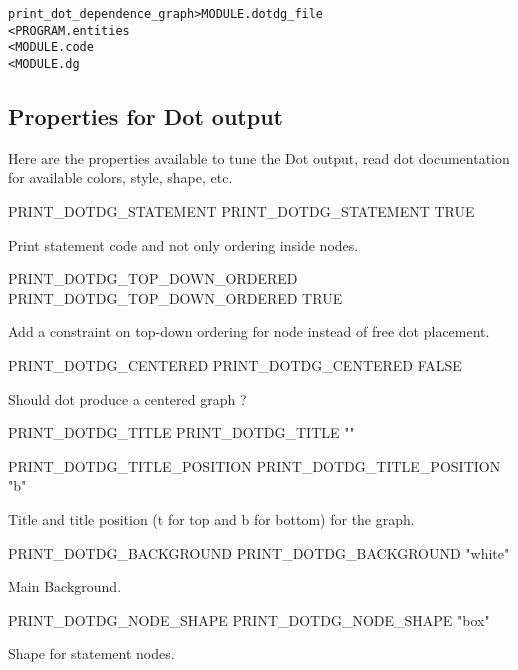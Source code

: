 \documentclass[a4paper]{report}
\newenvironment{PipsMake}{\begin{alltt}}{\end{alltt}}
\begin{document}
\begin{PipsMake}
print_dot_dependence_graph          > MODULE.dotdg_file
        < PROGRAM.entities
        < MODULE.code
        < MODULE.dg
\end{PipsMake}

\subsection{Properties for Dot output}

Here are the properties available to tune the Dot output, read dot
documentation for available colors, style, shape, etc.

\begin{PipsProp}{PRINT_DOTDG_STATEMENT}
PRINT_DOTDG_STATEMENT TRUE
\end{PipsProp}

Print statement code and not only ordering inside nodes.

\begin{PipsProp}{PRINT_DOTDG_TOP_DOWN_ORDERED}
  PRINT_DOTDG_TOP_DOWN_ORDERED TRUE
\end{PipsProp}

Add a constraint on top-down ordering for node instead of free dot placement.

\begin{PipsProp}{PRINT_DOTDG_CENTERED}
PRINT_DOTDG_CENTERED FALSE
\end{PipsProp}

Should dot produce a centered graph ?

\begin{PipsProp}{PRINT_DOTDG_TITLE}
PRINT_DOTDG_TITLE ""
\end{PipsProp}
\begin{PipsProp}{PRINT_DOTDG_TITLE_POSITION}
PRINT_DOTDG_TITLE_POSITION "b"
\end{PipsProp}

Title and title position (t for top and b for bottom) for the graph.


\begin{PipsProp}{PRINT_DOTDG_BACKGROUND}
PRINT_DOTDG_BACKGROUND "white"
\end{PipsProp}

Main Background.

\begin{PipsProp}{PRINT_DOTDG_NODE_SHAPE}
PRINT_DOTDG_NODE_SHAPE "box"
\end{PipsProp}

Shape for statement nodes.
\end{document}
